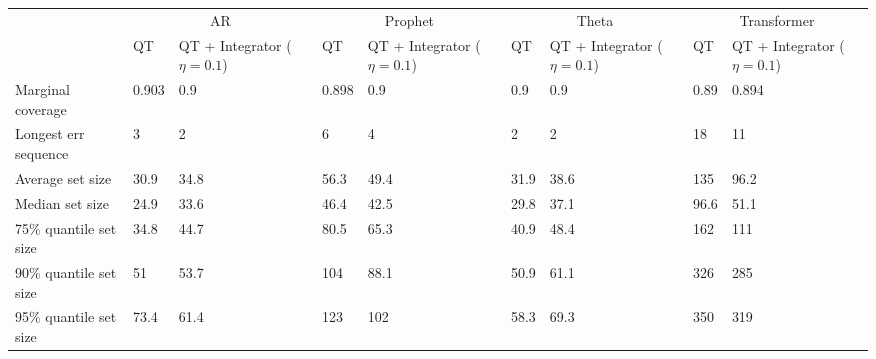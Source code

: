 \begin{tabular}{lllllllll}
\toprule
& \multicolumn{2}{c}{AR}& \multicolumn{2}{c}{Prophet}& \multicolumn{2}{c}{Theta}& \multicolumn{2}{c}{Transformer} \\
& QT & QT + Integrator ($\eta=0.1$) & QT & QT + Integrator ($\eta=0.1$) & QT & QT + Integrator ($\eta=0.1$) & QT & QT + Integrator ($\eta=0.1$) \\
\midrule
Marginal coverage & 0.903 & 0.9 & 0.898 & 0.9 & 0.9 & 0.9 & 0.89 & 0.894 \\
Longest err sequence & 3 & 2 & 6 & 4 & 2 & 2 & 18 & 11 \\
Average set size & 30.9 & 34.8 & 56.3 & 49.4 & 31.9 & 38.6 & 135 & 96.2 \\
Median set size & 24.9 & 33.6 & 46.4 & 42.5 & 29.8 & 37.1 & 96.6 & 51.1 \\
75\% quantile set size & 34.8 & 44.7 & 80.5 & 65.3 & 40.9 & 48.4 & 162 & 111 \\
90\% quantile set size & 51 & 53.7 & 104 & 88.1 & 50.9 & 61.1 & 326 & 285 \\
95\% quantile set size & 73.4 & 61.4 & 123 & 102 & 58.3 & 69.3 & 350 & 319 \\
\bottomrule
\end{tabular}
